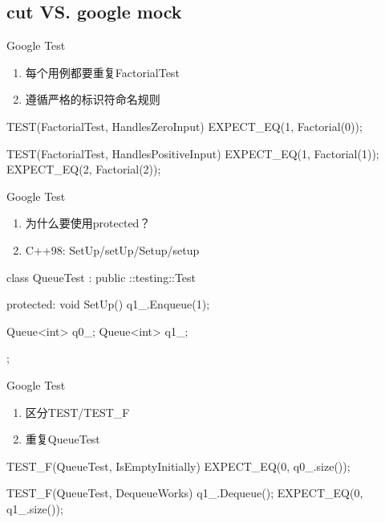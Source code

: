 \subsection{cut VS. google mock}

\begin{frame}[fragile]{Google Test}
\begin{enumerate}
  \item 每个用例都要重复FactorialTest
  \item 遵循严格的标识符命名规则  
\end{enumerate}

  \begin{c++}
TEST(FactorialTest, HandlesZeroInput) {
  EXPECT_EQ(1, Factorial(0));
}

TEST(FactorialTest, HandlesPositiveInput) {
  EXPECT_EQ(1, Factorial(1));
  EXPECT_EQ(2, Factorial(2));
}  
\end{c++}
\end{frame}

\begin{frame}[fragile]{Google Test}
\begin{enumerate}
  \item 为什么要使用protected？
  \item C++98: SetUp/setUp/Setup/setup
\end{enumerate}

  \begin{c++}
class QueueTest : public ::testing::Test {
protected:
  void SetUp() {
    q1_.Enqueue(1);
  }

  Queue<int> q0_;
  Queue<int> q1_;
};
\end{c++}
\end{frame}

\begin{frame}[fragile]{Google Test}
\begin{enumerate}
  \item 区分TEST/TEST\_F
  \item 重复QueueTest
\end{enumerate}

  \begin{c++}
TEST_F(QueueTest, IsEmptyInitially) {
  EXPECT_EQ(0, q0_.size());
}

TEST_F(QueueTest, DequeueWorks) 
{
  q1_.Dequeue();
  EXPECT_EQ(0, q1_.size());
}
\end{c++}
\end{frame}

